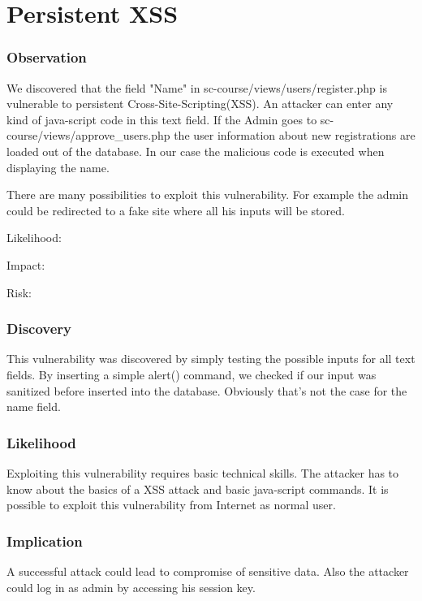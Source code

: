 \documentclass{article}
\begin{document}
\part*{Persistent XSS}

\section*{Observation}

We discovered that the field "Name" in sc-course/views/users/register.php is vulnerable to persistent Cross-Site-Scripting(XSS).
An attacker can enter any kind of java-script code in this text field. If the Admin goes to sc-course/views/approve\_users.php the user information about new registrations are  loaded out of the database. In our case the malicious code is executed when displaying the name.

There are many possibilities to exploit this vulnerability. For example the admin could be redirected to a fake site where all his inputs will be stored.\newline


Likelihood:  \newline

Impact: \newline

Risk: \newline

\section*{Discovery}

This vulnerability was discovered by simply testing the possible inputs for all text fields. By inserting a simple alert() command, we checked if our input was sanitized before inserted into the database. Obviously that's not the case for the name field.

\section*{Likelihood}
Exploiting this vulnerability requires basic technical skills. The attacker has to know about the basics of a XSS attack and basic java-script commands. It is possible to exploit this vulnerability from Internet as normal user.

\section*{Implication}
A successful attack could lead to compromise of sensitive data. Also the attacker could log in as admin by accessing his session key.
\end{document}
